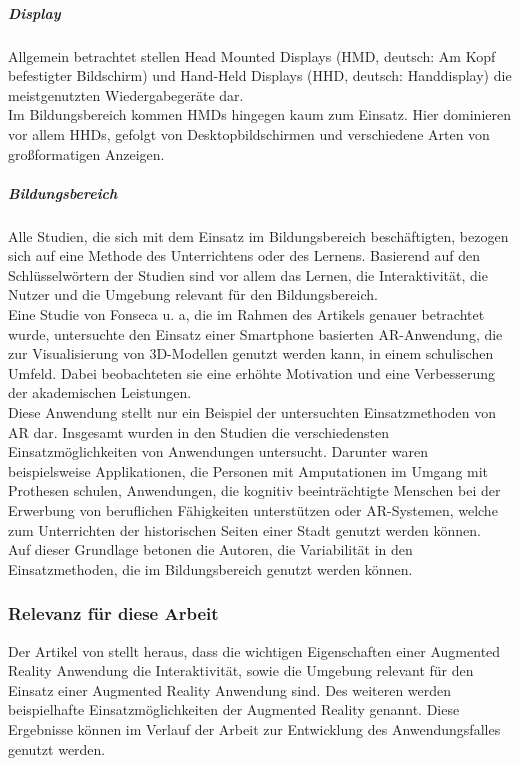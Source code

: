 \subparagraph{Display}
Allgemein betrachtet stellen Head Mounted Displays (HMD, deutsch: \glqq Am Kopf befestigter Bildschirm\grqq ) und Hand-Held Displays (HHD, deutsch: \glqq Handdisplay\grqq ) die meistgenutzten Wiedergabegeräte dar.\\
Im Bildungsbereich kommen HMDs hingegen kaum zum Einsatz. Hier dominieren vor allem HHDs, gefolgt von Desktopbildschirmen und  verschiedene Arten von großformatigen Anzeigen. \citep[Kapitel 3.7]{dey:review-of-ar-studies}

\subparagraph{Bildungsbereich}
Alle Studien, die sich mit dem Einsatz im Bildungsbereich beschäftigten, bezogen sich auf eine Methode des Unterrichtens oder des Lernens. Basierend auf den Schlüsselwörtern der Studien sind vor allem das Lernen, die Interaktivität, die Nutzer und die Umgebung relevant für den Bildungsbereich.\\
Eine Studie von Fonseca u. a, die im Rahmen des Artikels genauer betrachtet wurde, untersuchte den Einsatz einer Smartphone basierten AR-Anwendung, die zur Visualisierung von 3D-Modellen genutzt werden kann, in einem schulischen Umfeld. Dabei beobachteten sie eine erhöhte Motivation und eine Verbesserung der akademischen Leistungen. \\
Diese Anwendung stellt nur ein Beispiel der untersuchten Einsatzmethoden von AR dar. Insgesamt wurden in den Studien die verschiedensten Einsatzmöglichkeiten von Anwendungen untersucht. Darunter waren beispielsweise Applikationen, die Personen mit Amputationen im Umgang mit Prothesen schulen, Anwendungen, die kognitiv beeinträchtigte Menschen bei der Erwerbung von beruflichen Fähigkeiten unterstützen oder AR-Systemen, welche zum Unterrichten der historischen Seiten einer Stadt genutzt werden können. \\
Auf dieser Grundlage betonen die Autoren, die Variabilität in den Einsatzmethoden, die im Bildungsbereich genutzt werden können. \citep[Kapitel 4.2]{dey:review-of-ar-studies}

\subsubsection{Relevanz für diese Arbeit}
Der Artikel von \citeauthor{dey:review-of-ar-studies} stellt heraus, dass die wichtigen Eigenschaften einer Augmented Reality Anwendung die Interaktivität, sowie die Umgebung relevant für den Einsatz einer Augmented Reality Anwendung sind. Des weiteren werden beispielhafte Einsatzmöglichkeiten der Augmented Reality genannt. Diese Ergebnisse können im Verlauf der Arbeit zur Entwicklung des Anwendungsfalles genutzt werden.

